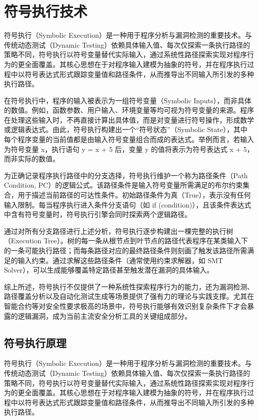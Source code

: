 \documentclass[print, master, vlined, timesmath]{DissertUESTC}
\begin{document}


\section{符号执行技术}

符号执行（Symbolic Execution）是一种用于程序分析与漏洞检测的重要技术\cite{}。与传统动态测试（Dynamic Testing）依赖具体输入值、每次仅探索一条执行路径的策略不同，符号执行以符号变量替代实际输入，通过系统性路径探索实现对程序行为的更全面覆盖。其核心思想在于对程序输入建模为抽象的符号，并在程序执行过程中以符号表达式形式跟踪变量值和路径条件，从而推导出不同输入所引发的多种执行路径。

在符号执行中，程序的输入被表示为一组符号变量（Symbolic Inputs），而非具体的数值。例如，函数参数、用户输入、环境变量等均可视为符号变量的来源。程序在处理这些输入时，不再直接计算出具体值，而是对变量进行符号操作，形成数学或逻辑表达式。由此，符号执行构建出一个“符号状态”（Symbolic State），其中每个程序变量的当前值都是由输入符号变量组合而成的表达式。举例而言，若输入为符号变量 x，执行语句 y = x + 5 后，变量 y 的值将表示为符号表达式 x + 5，而非实际的数值。

为正确记录程序执行路径中的分支选择，符号执行维护一个称为路径条件（Path Condition, PC）的逻辑公式\cite{}。该路径条件是输入符号变量所需满足的布尔约束集合，用于描述当前路径的可达性条件。初始路径条件为真（True），表示没有任何输入限制。每当程序执行进入条件分支语句（如 if (condition)），且该条件表达式中含有符号变量时，符号执行引擎会同时探索两个逻辑路径。

通过对所有分支路径进行上述分析，符号执行逐步构建出一棵完整的执行树（Execution Tree）\cite{}。树的每一条从根节点到叶节点的路径代表程序在某类输入下的一条可能执行路径；而每条路径对应的最终路径条件则刻画了触发该路径所需满足的输入约束。通过求解这些路径条件（通常使用约束求解器，如 SMT Solver），可以生成能够覆盖特定路径甚至触发潜在漏洞的具体输入。

综上所述，符号执行不仅提供了一种系统性探索程序行为的能力，还为漏洞检测、路径覆盖分析以及自动化测试生成等场景提供了强有力的理论与实践支撑。尤其在智能合约等对安全性要求极高的场景中，符号执行能够有效识别复杂条件下才会暴露的逻辑漏洞，成为当前主流安全分析工具的关键组成部分\cite{}。

\subsection{符号执行原理}
符号执行（Symbolic Execution）是一种用于程序分析与漏洞检测的重要技术\cite{}。与传统动态测试（Dynamic Testing）依赖具体输入值、每次仅探索一条执行路径的策略不同，符号执行以符号变量替代实际输入，通过系统性路径探索实现对程序行为的更全面覆盖。其核心思想在于对程序输入建模为抽象的符号，并在程序执行过程中以符号表达式形式跟踪变量值和路径条件，从而推导出不同输入所引发的多种执行路径。
\end{document}

